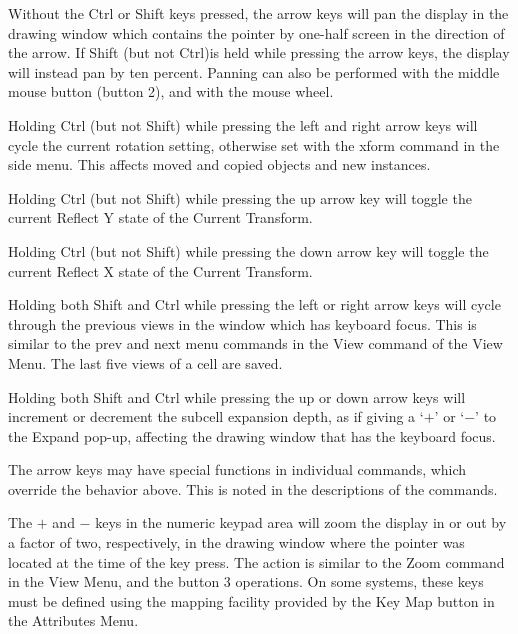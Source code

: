 Without the {\kb Ctrl} or {\kb Shift} keys pressed, the arrow keys
will pan the display in the drawing window which contains the pointer
by one-half screen in the direction of the arrow.  If {\kb Shift} (but
not {\kb Ctrl})is held while pressing the arrow keys, the display will
instead pan by ten percent.  Panning can also be performed with the
middle mouse button (button 2), and with the mouse wheel. 

Holding {\kb Ctrl} (but not {\kb Shift}) while pressing the left and
right arrow keys will cycle the current rotation setting, otherwise
set with the {\cb xform} command in the side menu.  This affects moved
and copied objects and new instances.

Holding {\kb Ctrl} (but not {\kb Shift}) while pressing the up arrow
key will toggle the current {\cb Reflect Y} state of the {\cb Current
Transform}.

Holding {\kb Ctrl} (but not {\kb Shift}) while pressing the down arrow
key will toggle the current {\cb Reflect X} state of the {\cb Current
Transform}.

Holding both {\kb Shift} and {\kb Ctrl} while pressing the left or
right arrow keys will cycle through the previous views in the window
which has keyboard focus.  This is similar to the {\cb prev} and {\cb
next} menu commands in the {\cb View} command of the {\cb View Menu}. 
The last five views of a cell are saved.

Holding both {\kb Shift} and {\kb Ctrl} while pressing the up or down
arrow keys will increment or decrement the subcell expansion depth, as
if giving a `$+$' or `$-$' to the {\cb Expand} pop-up, affecting the
drawing window that has the keyboard focus.

The arrow keys may have special functions in individual commands,
which override the behavior above.  This is noted in the descriptions
of the commands.

The {\kb $+$} and {\kb $-$} keys in the numeric keypad area will zoom
the display in or out by a factor of two, respectively, in the drawing
window where the pointer was located at the time of the key press. 
The action is similar to the {\cb Zoom} command in the {\cb View
Menu}, and the button 3 operations.  On some systems, these keys must
be defined using the mapping facility provided by the {\cb Key Map}
button in the {\cb Attributes Menu}.

